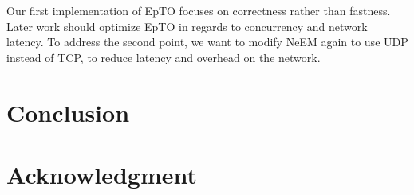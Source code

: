 \documentclass[10pt,conference,a4paper]{IEEEtran}
\begin{document}
Our first implementation of EpTO focuses on correctness rather than fastness. Later work should optimize EpTO in regards to concurrency and network latency. To address the second point, we want to modify NeEM again to use UDP instead of TCP, to reduce latency and overhead on the network.
\section{Conclusion}




\section*{Acknowledgment}




\begin{otherlanguage}{australian}
\printbibliography
\end{otherlanguage}

\end{document}
